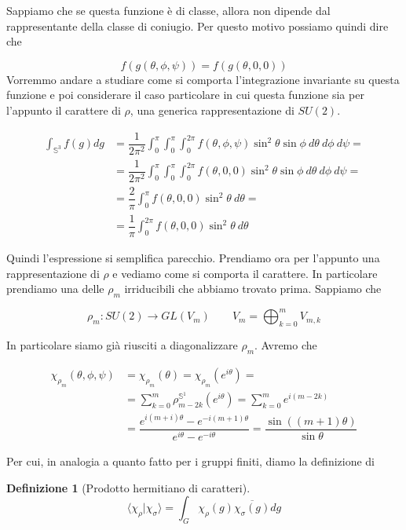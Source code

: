 \documentclass[11pt]{article}
\theoremstyle{plain}
\theoremstyle{definition}
\newtheorem{defn}{Definizione}[section]
\theoremstyle{remark}
\newcommand{\dsum}{\displaystyle\sum}
\newcommand{\dint}{\displaystyle\int}
\begin{document}
 Sappiamo che se questa funzione è di classe, allora non dipende dal rappresentante della classe di coniugio. Per questo motivo possiamo quindi dire che

 \[ f(g(\theta, \phi, \psi)) = f(g(\theta, 0 , 0)) \]
 Vorremmo andare a studiare come si comporta l'integrazione invariante su questa funzione e poi considerare il caso particolare in cui questa funzione sia per l'appunto il carattere di $\rho$, una generica rappresentazione di $SU(2)$.

 \begin{align*}
 \dint_{\mathbb{S}^3} f(g) dg &= \dfrac{1}{2\pi^2} \dint_0^\pi \dint_0^{\pi} \dint_0 ^{2\pi} f(\theta, \phi, \psi) \sin^2\theta\sin\phi \ d\theta \ d\phi \ d\psi = \\
 &=\dfrac{1}{2\pi^2} \dint_0^\pi \dint_0^{\pi} \dint_0 ^{2\pi} f(\theta, 0, 0) \sin^2\theta\sin\phi \ d\theta \ d\phi \ d\psi = \\
 &= \dfrac{2}{\pi} \dint_0^\pi f(\theta, 0, 0) \sin^2\theta \ d\theta = \\
  &= \dfrac{1}{\pi} \dint_0^{2\pi} f(\theta, 0, 0) \sin^2\theta \ d\theta
 \end{align*}

 Quindi l'espressione si semplifica parecchio. Prendiamo ora per l'appunto una rappresentazione di $\rho$ e vediamo come si comporta il carattere. In particolare prendiamo una delle $\rho_m$ irriducibili che abbiamo trovato prima. Sappiamo che

 \[ \rho_m: SU(2) \to GL(V_m) \qquad V_m = \bigoplus_{k=0}^m V_{m,k}\]

 In particolare siamo già riusciti a diagonalizzare $\rho_m$. Avremo che

 \begin{align*}
   \chi_{\rho_m} (\theta, \phi, \psi) &= \chi_{\rho_m}(\theta) = \chi_{\rho_m}(e^{i\theta}) = \\
   &= \dsum_{k=0}^m \rho_{m-2k}^{\mathbb{S}^1}(e^{i\theta}) = \dsum_{k=0}^m e^{i(m-2k)} \\
   &= \dfrac{e^{i(m+i)\theta} - e^{-i(m+1)\theta}}{e^{i\theta} - e^{-i\theta}} = \dfrac{\sin((m+1)\theta)}{\sin\theta}
 \end{align*}



 Per cui, in analogia a quanto fatto per i gruppi finiti, diamo la definizione di

 \begin{defn}[Prodotto hermitiano di caratteri]

   \[
   \langle \chi_\rho | \chi_\sigma \rangle = \dint_G \chi_\rho(g) \overline{\chi_\sigma(g)} dg
   \]

 \end{defn}
\end{document}
